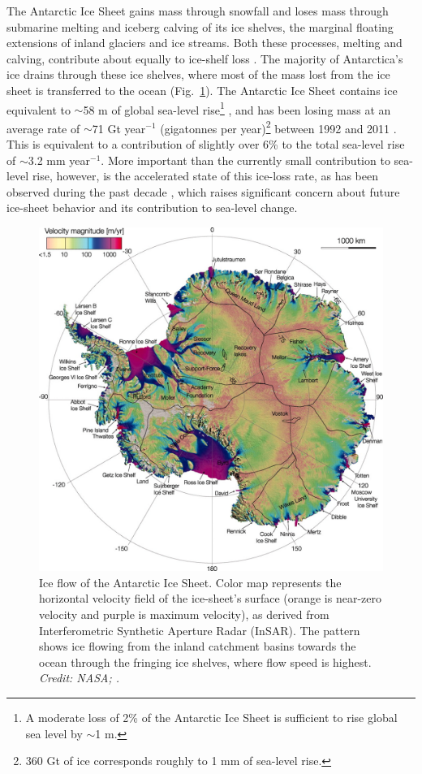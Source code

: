 The Antarctic Ice Sheet gains mass through snowfall and loses mass through submarine melting and iceberg calving of its ice shelves, the marginal floating extensions of inland glaciers and ice streams. Both these processes, melting and calving, contribute about equally to ice-shelf loss \parencite{Rignot2013, Depoorter2013}. The majority of Antarctica's ice drains through these ice shelves, where most of the mass
lost from the ice sheet is transferred to the ocean (Fig.~\ref{fig:ice-sheet-flow}). The Antarctic Ice Sheet contains ice equivalent to $\sim$58 m of global sea-level rise\footnote{A moderate loss of 2\% of the Antarctic Ice Sheet is sufficient to rise
global sea level by $\sim$1 m.} \parencite{Fretwell2013}, and has been losing mass at an average rate of
$\sim$71 Gt year$^{-1}$ (gigatonnes per year)\footnote{360 Gt of ice corresponds roughly to 1 mm of sea-level rise.} between 1992 and 2011
\parencite{Shepherd2012}. This is equivalent to a contribution of
slightly over 6\% to the total sea-level rise of $\sim$3.2 mm year$^{-1}$.
 More important than the currently small contribution to sea-level rise, however, is the accelerated state of this ice-loss rate, as has been observed during the past decade \parencite{Shepherd2012, Sutterley2014, Velicogna2009, Chen2009, Harig2015}, which raises significant concern about future ice-sheet behavior and its contribution to sea-level change. 


\begin{figure}[!ht]
\centering
  \includegraphics[width=.88\textwidth]{img/ice_sheet_flow4.jpg} %
  \caption[Ice flow of the Antarctic Ice Sheet]{
  \ssp \footnotesize
  Ice flow of the Antarctic Ice Sheet. Color map represents the horizontal velocity field of the ice-sheet's surface (orange is near-zero velocity and purple is maximum velocity), as derived from Interferometric Synthetic Aperture Radar (InSAR). The pattern shows ice flowing from the inland catchment basins towards the ocean through the fringing ice shelves, where flow speed is highest. {\it Credit: NASA; \textcite{Rignot2011}.}
  }
  \label{fig:ice-sheet-flow}
\end{figure}


